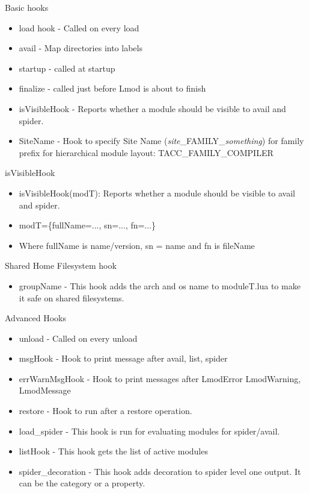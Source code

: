 \documentclass{beamer}
\begin{document}
\begin{frame}{Basic hooks}
  \begin{itemize}
    \item load hook - Called on every load
    \item avail - Map directories into labels
    \item startup - called at startup
    \item finalize - called just before Lmod is about to finish
    \item isVisibleHook - Reports whether a module should be visible
      to avail and spider.
    \item SiteName - Hook to specify Site Name
      (\emph{site}\_FAMILY\_\emph{something}) for family prefix for
      hierarchical module layout: TACC\_FAMILY\_COMPILER
  \end{itemize}
\end{frame}

\begin{frame}{isVisibleHook}
  \begin{itemize}
    \item isVisibleHook(modT): Reports whether a module should be visible
      to avail and spider.
    \item modT=\{fullName=..., sn=..., fn=...\}
    \item Where fullName is name/version, sn = name and fn is fileName
  \end{itemize}
\end{frame}

\begin{frame}{Shared Home Filesystem hook}
  \begin{itemize}
    \item groupName - This hook adds the arch and os name to
      moduleT.lua to make it safe on shared filesystems.
  \end{itemize}
\end{frame}

\begin{frame}{Advanced Hooks}
  \begin{itemize}
    \item unload - Called on every unload
    \item msgHook - Hook to print message after avail, list, spider
    \item errWarnMsgHook - Hook to print messages after LmodError LmodWarning, LmodMessage    
    \item restore - Hook to run after a restore operation.
    \item load\_spider - This hook is run for evaluating modules for spider/avail.
    \item listHook - This hook gets the list of active modules
    \item spider\_decoration -  This hook adds decoration to spider
      level one output. It can be the category or a property.

  \end{itemize}
\end{frame}
\end{document}
